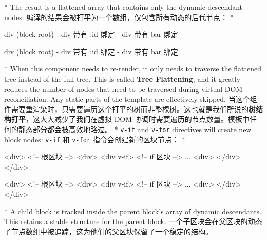 \begin{paracol}{2}
\switchcolumn[0]*%
The result is a flattened array that contains only the dynamic
descendant nodes:
\switchcolumn
编译的结果会被打平为一个数组，仅包含所有动态的后代节点：
\switchcolumn[0]*%
\begin{codeHtml}
div (block root)
- div 带有 :id 绑定
- div 带有 {{ bar }} 绑定
\end{codeHtml}
\switchcolumn
\begin{codeHtml}
div (block root)
- div 带有 :id 绑定
- div 带有 {{ bar }} 绑定
\end{codeHtml}
\switchcolumn[0]*%
When this component needs to re-render, it only needs to traverse the
flattened tree instead of the full tree. This is called \textbf{Tree
Flattening}, and it greatly reduces the number of nodes that need to be
traversed during virtual DOM reconciliation. Any static parts of the
template are effectively skipped.
\switchcolumn
当这个组件需要重渲染时，只需要遍历这个打平的树而非整棵树。这也就是我们所说的\textbf{树结构打平}，这大大减少了我们在虚拟
DOM 协调时需要遍历的节点数量。模板中任何的静态部分都会被高效地略过。
\switchcolumn[0]*%
\texttt{v-if} and \texttt{v-for} directives will create new block nodes:
\switchcolumn
\texttt{v-if} 和 \texttt{v-for} 指令会创建新的区块节点：
\switchcolumn[0]*%
\begin{codeHtml}
<div> <!-- 根区块 -->
  <div>
    <div v-if> <!-- if 区块 -->
      ...
    <div>
  </div>
</div>
\end{codeHtml}
\switchcolumn
\begin{codeHtml}
<div> <!-- 根区块 -->
  <div>
    <div v-if> <!-- if 区块 -->
      ...
    <div>
  </div>
</div>
\end{codeHtml}
\switchcolumn[0]*%
A child block is tracked inside the parent block's array of dynamic
descendants. This retains a stable structure for the parent block.
\switchcolumn
一个子区块会在父区块的动态子节点数组中被追踪，这为他们的父区块保留了一个稳定的结构。
\end{paracol}



